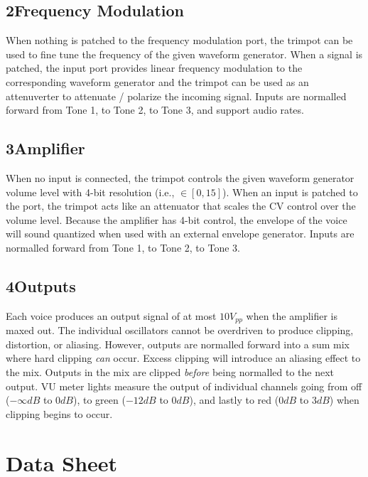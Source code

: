 \documentclass[12pt,letter]{article}
\begin{document}
\subsection*{2{\quad}Frequency Modulation}

When nothing is patched to the frequency modulation port, the trimpot can be used to fine tune the frequency of the given waveform generator. When a signal is patched, the input port provides linear frequency modulation to the corresponding waveform generator and the trimpot can be used as an attenuverter to attenuate / polarize the incoming signal. Inputs are normalled forward from Tone 1, to Tone 2, to Tone 3, and support audio rates.

\subsection*{3{\quad}Amplifier}

When no input is connected, the trimpot controls the given waveform generator volume level with 4-bit resolution (i.e., $\in [0, 15]$). When an input is patched to the port, the trimpot acts like an attenuator that scales the CV control over the volume level. Because the amplifier has 4-bit control, the envelope of the voice will sound quantized when used with an external envelope generator. Inputs are normalled forward from Tone 1, to Tone 2, to Tone 3.

\subsection*{4{\quad}Outputs}

Each voice produces an output signal of at most $10V_{pp}$ when the amplifier is maxed out. The individual oscillators cannot be overdriven to produce clipping, distortion, or aliasing. However, outputs are normalled forward into a sum mix where hard clipping \textit{can} occur. Excess clipping will introduce an aliasing effect to the mix. Outputs in the mix are clipped \textit{before} being normalled to the next output. VU meter lights measure the output of individual channels going from off ($-\infty dB$ to $0dB$), to green ($-12dB$ to $0dB$), and lastly to red ($0dB$ to $3dB$) when clipping begins to occur.


\clearpage
\section*{Data Sheet}
\end{document}
